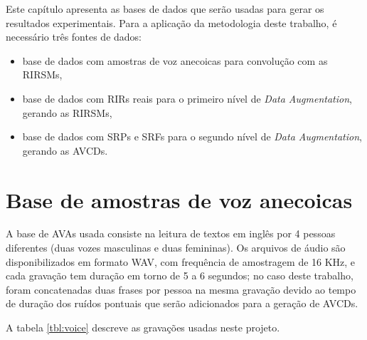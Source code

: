 Este capítulo apresenta as bases de dados que serão usadas para gerar os resultados experimentais.
Para a aplicação da metodologia deste trabalho, é necessário três fontes de dados:

\begin{itemize}
    \item base de dados com amostras de voz anecoicas para convolução com as RIRSMs,
    \item base de dados com RIRs reais para o primeiro nível de \textit{Data Augmentation}, gerando as RIRSMs,
    \item base de dados com SRPs e SRFs para o segundo nível de \textit{Data Augmentation}, gerando as AVCDs.
\end{itemize}


\section{Base de amostras de voz anecoicas}

A base de AVAs usada consiste na leitura de textos em inglês por 4 pessoas diferentes (duas vozes masculinas e duas femininas).
Os arquivos de áudio são disponibilizados em formato WAV, com frequência de amostragem de 16 KHz, e cada gravação tem duração
em torno de 5 a 6 segundos; no caso deste trabalho, foram concatenadas duas frases por pessoa na mesma 
gravação devido ao tempo de duração dos ruídos pontuais que serão adicionados para a geração de AVCDs.

A tabela \ref{tbl:voice} descreve as gravações usadas neste projeto.

